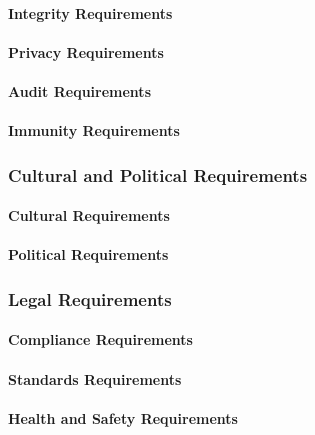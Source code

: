 \documentclass[12pt]{article}
\begin{document}
\paragraph{Integrity Requirements}
\paragraph{Privacy Requirements}
\paragraph{Audit Requirements}
\paragraph{Immunity Requirements}


\subsubsection{Cultural and Political Requirements}
\paragraph{Cultural Requirements}
\paragraph{Political Requirements}


\subsubsection{Legal Requirements}
\paragraph{Compliance Requirements}
\paragraph{Standards Requirements}
\paragraph{Health and Safety Requirements}
\end{document}
